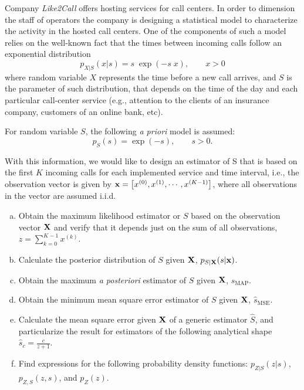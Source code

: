 \begin{prob}
\label{ProbEstLab}

Company {\em Like2Call} offers hosting services for call centers. In order to dimension the staff of operators the company is designing a statistical model to characterize the activity in the hosted call centers. One of the components of such a model relies on the well-known fact that the times between incoming calls follow an exponential distribution
$$p_{X|S}(x|s) = s \; \exp(-s\; x), \qquad x>0$$
where random variable $X$ represents the time before a new call arrives, and $S$ is the parameter of such distribution, that depends on the time of the day and each particular call-center service (e.g., attention to the clients of an insurance company, customers of an online bank, etc). 

For random variable $S$, the following {\em a priori} model is assumed:
$$p_S(s) = \exp(-s), \qquad s>0.$$

With this information, we would like to design an estimator of S that is based on the first $K$ incoming calls for each implemented service and time interval, i.e., the observation vector is given by ${\bf x} = \left[x^{(0)}, x^{(1)}, \cdots, x^{(K-1)}\right]$, where all observations in the vector are assumed i.i.d.

\begin{enumerate}[a)]
    \item Obtain the maximum likelihood estimator or $S$ based on the observation vector $\bf X$ and verify that it depends just on the sum of all observations, $z=\sum_{k=0}^{K-1} x^{(k)}$.
    
    \item Calculate the posterior distribution of $S$ given $\bf X$, $p_{S|{\bf X}}(s|{\bf x})$.
    
    \item Obtain the maximum {\em a posteriori} estimator of $S$ given $\bf X$, ${\hat s}_\text{MAP}$.
    
    \item Obtain the minimum mean square error estimator of $S$ given $\bf X$, ${\hat s}_\text{MSE}$.
    
    \item Calculate the mean square error given ${\bf X}$ of a generic estimator $\hat S$, and particularize the result for estimators of the following analytical shape $\hat{s}_c = \frac{c}{z+1}$.

    \item Find expressions for the following probability density functions: $p_{Z|S}(z|s)$, $p_{Z,S}(z,s)$, and $p_{Z}(z)$.
    

\end{enumerate}
\end{prob}
